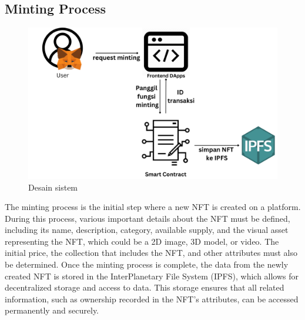 
\subsection{Minting Process}
\begin{figure}[H] \centering
  \includegraphics[scale=0.17]{gambar/proses_minting.png}
  \caption{Desain sistem}
  \label{fig:proses_minting}
\end{figure}

The minting process is the initial step where a new NFT is created on a platform. During this process, various important details about the NFT must be defined, including its name, description, category, available supply, and the visual asset representing the NFT, which could be a 2D image, 3D model, or video. The initial price, the collection that includes the NFT, and other attributes must also be determined. Once the minting process is complete, the data from the newly created NFT is stored in the InterPlanetary File System (IPFS), which allows for decentralized storage and access to data. This storage ensures that all related information, such as ownership recorded in the NFT’s attributes, can be accessed permanently and securely.

